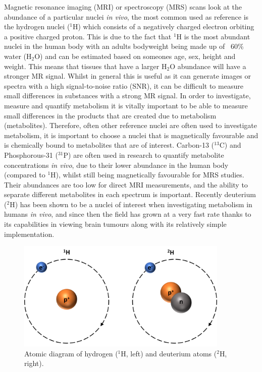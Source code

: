 \documentclass[class=article, crop=false]{standalone}
\begin{document}
 
\label{Chap:Introduction}

Magnetic resonance imaging (MRI) or spectroscopy (MRS) scans look at the abundance of a particular nuclei \textit{in vivo}, the most common used as reference is the hydrogen nuclei ($^1$H) which consists of a negatively charged electron orbiting a positive charged proton. This is due to the fact that $^1$H is the most abundant nuclei in the human body with an adults bodyweight being made up of ~60\% water (H$_2$O) and can be estimated based on someones age, sex, height and weight\cite{Watson1980TotalMeasurements}. This means that tissues that have a larger H$_2$O abundance will have a stronger MR signal. Whilst in general this is useful as it can generate images or spectra with a high signal-to-noise ratio (SNR), it can be difficult to measure small differences in substances with a strong MR signal. In order to investigate, measure and quantify metabolism it is vitally important to be able to measure small differences in the products that are created due to metabolism (metabolites). Therefore, often other reference nuclei are often used to investigate metabolism, it is important to choose a nuclei that is magnetically favourable and is chemically bound to metabolites that are of interest. Carbon-13 ($^{13}$C)\cite{Grist2019QuantifyingImaging,Brender2019DynamicHyperpolarization} and Phosphorous-31 ($^{31}$P)\cite{Gordon1980LocalizationResonance} are often used in research to quantify metabolite concentrations \textit{in vivo}, due to their lower abundance in the human body (compared to $^1$H), whilst still being magnetically favourable for MRS studies. Their abundances are too low for direct MRI measurements, and the ability to separate different metabolites in each spectrum is important. Recently deuterium ($^2$H) has been shown to be a nuclei of interest when investigating metabolism in humans \textit{in vivo}\cite{Lu2017QuantitativeSpectroscopy,DeFeyter2018DeuteriumVivo}, and since then the field has grown at a very fast rate thanks to its capabilities in viewing brain tumours\cite{DeFeyter2018DeuteriumVivo} along with its relatively simple implementation.

\begin{figure}
    \centering
    \includegraphics[width=0.9\textwidth]{Figures/Intro/1H2H.png}
    \caption{Atomic diagram of hydrogen ($^1$H, left) and deuterium atoms ($^2$H, right).}
    \label{fig:intro:1H2H}
\end{figure}
\end{document}
